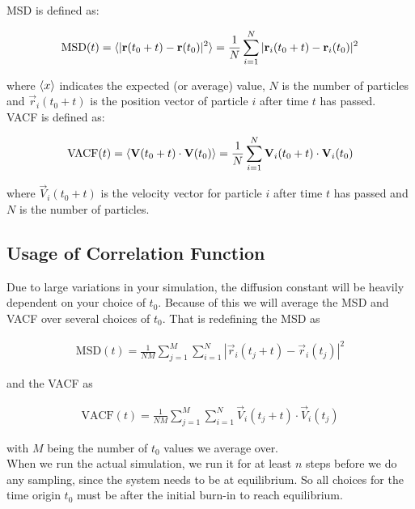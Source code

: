 \documentclass{article}
\begin{document}
MSD is defined as:

\begin{eqnarray}
    \mathrm{MSD}(t) = \langle |{\bf r}(t_0 + t) - {\bf r}(t_0)|^2 \rangle
    = \frac{1}{N} \sum_{i=1}^N | {\bf r}_i(t_0 + t) - {\bf r}_i(t_0)  |^2
\end{eqnarray}

where $\langle x \rangle$ indicates the expected (or average) value,
$N$ is the number of particles and
$\vec{r}_i(t_0 + t)$ is the position vector of particle $i$ after time $t$ has passed.\\

VACF is defined as:

\begin{eqnarray}
    \mathrm{VACF}(t) = \langle {\bf V}(t_0 + t)\cdot{\bf V}(t_0) \rangle
    = \frac{1}{N} \sum_{i=1}^N {\bf V}_i(t_0 + t) \cdot {\bf V}_i(t_0)
\end{eqnarray}

where
$\vec{V}_i(t_0 + t)$ is the velocity vector for particle $i$ after time $t$ has passed 
and $N$ is the number of particles.

\newpage

\subsection{Usage of Correlation Function}

Due to large variations in your simulation, the diffusion constant will be heavily dependent on your choice of $t_0$.
Because of this we will average the MSD and VACF over several choices of $t_0$. That is redefining the MSD as

\begin{eqnarray}
    \mathrm{MSD}(t) = \frac{1}{NM} \sum_{j=1}^M \sum_{i=1}^N | \vec{r}_i(t_j + t) - \vec{r}_i(t_j)  |^2
\end{eqnarray}

and the VACF as 

\begin{eqnarray}
    \mathrm{VACF}(t) = \frac{1}{NM} \sum_{j=1}^M \sum_{i=1}^N \vec{V}_i(t_j + t) \cdot \vec{V}_i(t_j)
\end{eqnarray}

with $M$ being the number of $t_0$ values we average over. \\

When we run the actual simulation, we run it for at least $n$ steps before we do any sampling, since the system needs to be at equilibrium.
So all choices for the time origin $t_0$ must be after the initial burn-in to reach equilibrium.
\end{document}
